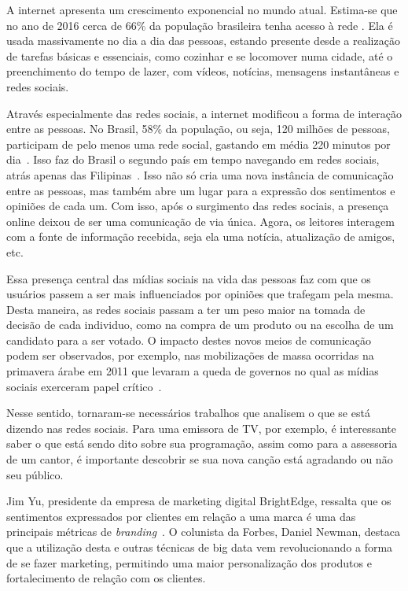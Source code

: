 
A internet apresenta um crescimento exponencial no mundo atual.
Estima-se que no ano de 2016 cerca de 66\% da população brasileira tenha acesso à rede \cite{social17}.
Ela é usada massivamente no dia a dia das pessoas, estando presente desde a realização de tarefas básicas e essenciais,
como cozinhar e se locomover numa cidade, até o preenchimento do tempo de lazer, com vídeos, notícias, mensagens
instantâneas e redes sociais.

Através especialmente das redes sociais, a internet modificou a forma de interação entre as pessoas.
No Brasil, 58\% da população, ou seja, 120 milhões de pessoas, participam de pelo menos uma rede social, gastando em
média 220 minutos por dia~\cite{social17}.
Isso faz do Brasil o segundo país em tempo navegando em redes sociais, atrás apenas das Filipinas~\cite{social17}.
Isso não só cria uma nova instância de comunicação entre as pessoas, mas também abre um lugar para a expressão dos
sentimentos e opiniões de cada um.
Com isso, após o surgimento das redes sociais, a presença online deixou de ser uma comunicação de via única.
Agora, os leitores interagem com a fonte de informação recebida, seja ela uma notícia, atualização de amigos, etc.

Essa presença central das mídias sociais na vida das pessoas faz com que os usuários passem a ser mais influenciados
por opiniões que trafegam pela mesma.
Desta maneira, as redes sociais passam a ter um peso maior na tomada de decisão de cada individuo, como na compra de
um produto ou na escolha de um candidato para a ser votado.
O impacto destes novos meios de comunicação podem ser observados, por exemplo, nas mobilizações de massa ocorridas na
primavera árabe em 2011 que levaram a queda de governos no qual as mídias sociais exerceram papel
crítico~\cite{mourtada11}.

Nesse sentido, tornaram-se necessários trabalhos que analisem o que se está dizendo nas redes sociais.
Para uma emissora de TV, por exemplo, é interessante saber o que está sendo dito sobre sua programação, assim como para
a assessoria de um cantor, é importante descobrir se sua nova canção está agradando ou não seu público.

Jim Yu, presidente da empresa de marketing digital BrightEdge, ressalta que os sentimentos expressados por clientes em
relação a uma marca é uma das principais métricas de \textit{branding}~\cite{marketingland}.
O colunista da Forbes, Daniel Newman, destaca que a utilização desta e outras técnicas de big data vem revolucionando
a forma de se fazer marketing, permitindo uma maior personalização dos produtos e fortalecimento de relação com os
clientes.

